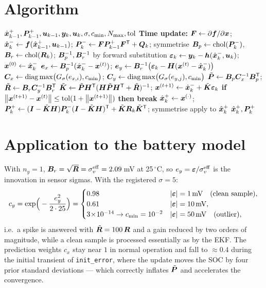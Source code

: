 \section{Algorithm}
\begin{algorithm}[H]
\caption{MC-EKF --- one sampling period}
\begin{algorithmic}[1]
\Require $\hat{\bm{x}}^{+}_{k-1},\bm{P}^{+}_{k-1},\bm{u}_{k-1},\bm{y}_k,\bm{u}_k,\sigma,c_{\min},N_{\max},\mathrm{tol}$
\State \textbf{Time update:} $\bm{F}\gets\partial\bm{f}/\partial\bm{x}$;\;
  $\hat{\bm{x}}^{-}_k\gets\bm{f}(\hat{\bm{x}}^{+}_{k-1},\bm{u}_{k-1})$;\;
  $\bm{P}^{-}_k\gets\bm{F}\bm{P}^{+}_{k-1}\bm{F}^{\mathsf{T}}+\bm{Q}_k$; symmetrise
\State $\bm{B}_p\gets\operatorname{chol}(\bm{P}^{-}_k)$, $\bm{B}_r\gets\operatorname{chol}(\bm{R}_k)$;\;
  $\bm{B}_p^{-1},\bm{B}_r^{-1}$ by forward substitution
\State $\bm{\varepsilon}_k\gets\bm{y}_k-\bm{h}(\hat{\bm{x}}^{-}_k,\bm{u}_k)$;\quad $\bm{x}^{(0)}\gets\hat{\bm{x}}^{-}_k$
 
  \State $\bm{e}_x\gets\bm{B}_p^{-1}(\hat{\bm{x}}^{-}_k-\bm{x}^{(t)})$;\quad
         $\bm{e}_y\gets\bm{B}_r^{-1}\big(\bm{\varepsilon}_k-\bm{H}(\bm{x}^{(t)}-\hat{\bm{x}}^{-}_k)\big)$
  \State $\bm{C}_x\gets\operatorname{diag}\max\!\big(G_\sigma(e_{x,i}),c_{\min}\big)$;\quad
         $\bm{C}_y\gets\operatorname{diag}\max\!\big(G_\sigma(e_{y,j}),c_{\min}\big)$
  \State $\tilde{\bm{P}}\gets\bm{B}_p\bm{C}_x^{-1}\bm{B}_p^{\mathsf{T}}$;\quad
         $\tilde{\bm{R}}\gets\bm{B}_r\bm{C}_y^{-1}\bm{B}_r^{\mathsf{T}}$ 
  \State $\tilde{\bm{K}}\gets\tilde{\bm{P}}\bm{H}^{\mathsf{T}}(\bm{H}\tilde{\bm{P}}\bm{H}^{\mathsf{T}}+\tilde{\bm{R}})^{-1}$;\quad
         $\bm{x}^{(t+1)}\gets\hat{\bm{x}}^{-}_k+\tilde{\bm{K}}\bm{\varepsilon}_k$
  \State \textbf{if} $\left\lVert \bm{x}^{(t+1)}-\bm{x}^{(t)} \right\rVert\le\mathrm{tol}(1+\left\lVert \bm{x}^{(t+1)} \right\rVert)$
         \textbf{then break}
\EndFor
\State $\hat{\bm{x}}^{+}_k\gets\bm{x}^{(\cdot)}$;\quad
  $\bm{P}^{+}_k\gets(\bm{I}-\tilde{\bm{K}}\bm{H})\bm{P}^{-}_k(\bm{I}-\tilde{\bm{K}}\bm{H})^{\mathsf{T}}+\tilde{\bm{K}}\bm{R}_k\tilde{\bm{K}}^{\mathsf{T}}$;
  symmetrise
\State apply  to $\hat{\bm{x}}^{+}_k$
\Ensure $\hat{\bm{x}}^{+}_k,\bm{P}^{+}_k$
\end{algorithmic}
\end{algorithm}

\section{Application to the battery model}
With $n_y=1$, $\bm{B}_r=\sqrt{\bm{R}}=\sigma_v^{\mathrm{eff}}=2.09$\,mV at 25\,\ensuremath{{}^\circ}C, so
$e_y=\bm{\varepsilon}/\sigma_v^{\mathrm{eff}}$ is the innovation in sensor sigmas.  With the registered
$\sigma=5$:
\[
c_y = \exp\!\Big(-\frac{e_y^2}{2\cdot 25}\Big) =
\begin{cases}
 0.98 & |\bm{\varepsilon}|=1\,\text{mV} \quad(\text{clean sample}),\\
 0.61 & |\bm{\varepsilon}|=10\,\text{mV},\\
 3\!\times\!10^{-14}\to c_{\min}=10^{-2} & |\bm{\varepsilon}|=50\,\text{mV}\quad(\text{outlier}),
\end{cases}
\]
i.e.\ a spike is answered with $\tilde{\bm{R}}=100\,\bm{R}$ and a gain reduced by two orders of
magnitude, while a clean sample is processed essentially as by the EKF.  The prediction weights
$c_x$ stay near $1$ in normal operation and fall to $\approx0.4$ during the initial transient of
\texttt{init\_error}, where the update moves the SOC by four prior standard deviations --- which
correctly inflates $\tilde{\bm{P}}$ and accelerates the convergence.

